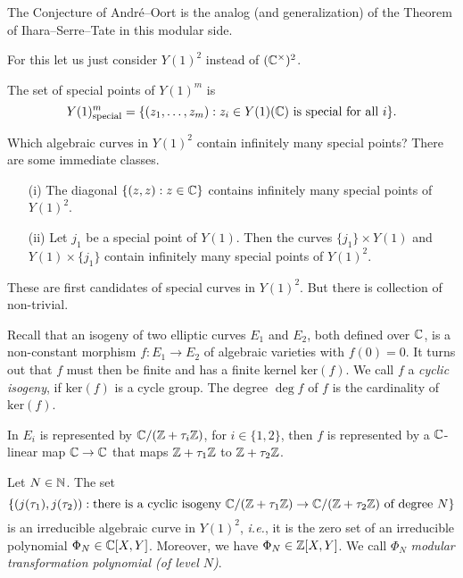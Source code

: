 The Conjecture of Andr\'e--Oort is the analog (and generalization) of
the Theorem of Ihara--Serre--Tate in this modular side.

For this let us just consider $Y(1)^2$ instead of $({\mathbb{C}}^\times)^2$.
\begin{definition}
  \label{def:specialY1m}
  The set of special points of  $Y(1)^m$ is
  $$Y(1)^m_{\mathrm{special}}=\{(z_1,\ldots,z_m) :
  z_i\in Y(1)({\mathbb{C}})\text{ is special for all $i$} \}.$$
\end{definition}

Which algebraic curves in $Y(1)^2$ contain infinitely many special
points? There are some immediate classes.

\begin{example}
  \begin{enumerate}
  \item[(i)] The diagonal  $\{(z,z) : z\in{\mathbb{C}}\}$ contains infinitely
    many special points of $Y(1)^2$. 
  \item [(ii)]  Let $j_1$ be a special point of $Y(1)$.  Then the curves
    $\{j_1\}\times Y(1)$ and $Y(1)\times \{j_1\}$ contain infinitely many
    special points of $Y(1)^2$. 
  \end{enumerate}
\end{example}

These are first candidates of special curves in $Y(1)^2$. 
But there is collection of non-trivial.

Recall that an isogeny of two elliptic curves $E_1$ and $E_2$, both
defined over ${\mathbb{C}}$, is a non-constant morphism $f\colon E_1\rightarrow
E_2$ of algebraic varieties with $f(0)=0$. It turns out that $f$ must
then be finite and has a finite kernel $\mathrm{ker}(f)$.
We call $f$ a \emph{cyclic isogeny}, if $\mathrm{ker}(f)$ is a cycle
group. The degree $\deg f$ of $f$ is the cardinality of $\mathrm{ker}(f)$. 

In $E_i$ is represented by ${\mathbb{C}}/({\mathbb{Z}}+\tau_i{\mathbb{Z}})$, for $i\in \{1,2\}$,
then $f$ is represented by a ${\mathbb{C}}$-linear map ${\mathbb{C}}\rightarrow{\mathbb{C}}$ that
maps ${\mathbb{Z}}+\tau_1{\mathbb{Z}}$ to ${\mathbb{Z}}+\tau_2{\mathbb{Z}}$.

\begin{deflemma}
  \label{deflem:modtranspoly}
  Let $N\in{\mathbb{N}}$. The set
  \begin{equation*}
    \left\{ (j(\tau_1),j(\tau_2)) : \text{there is a cyclic isogeny 
        ${\mathbb{C}}/({\mathbb{Z}}+\tau_1{\mathbb{Z}})\rightarrow {\mathbb{C}}/({\mathbb{Z}}+\tau_2{\mathbb{Z}})$ of degree $N$}\right\}
  \end{equation*}
  is an irreducible algebraic curve in $Y(1)^2$, \textit{i.e.}, it is
  the zero set of an irreducible polynomial $\Phi_N\in{\mathbb{C}}[X,Y]$.
  Moreover, we have $\Phi_N\in{\mathbb{Z}}[X,Y]$. We call $\Phi_N$
  \emph{modular transformation polynomial (of level $N$)}.
\end{deflemma}

